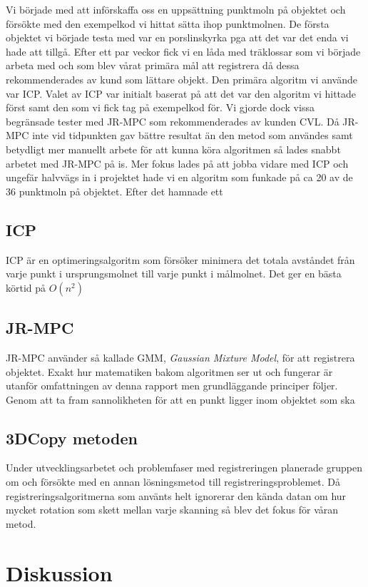 Vi började med att införskaffa oss en uppsättning punktmoln på objektet och försökte med den exempelkod vi hittat sätta ihop punktmolnen. De första objektet vi började testa med var en porslinskyrka pga att det var det enda vi hade att tillgå. Efter ett par veckor fick vi en låda med träklossar som vi började arbeta med och som blev vårat primära mål att registrera då dessa rekommenderades av kund som lättare objekt.
 Den primära algoritm vi använde var ICP. Valet av ICP var initialt baserat på att det var den algoritm vi hittade först samt den som vi fick tag på exempelkod för. Vi gjorde dock vissa begränsade tester med JR-MPC som rekommenderades av kunden CVL. Då JR-MPC inte vid tidpunkten gav bättre resultat än den metod som användes samt betydligt mer manuellt arbete för att kunna köra algoritmen så lades snabbt arbetet med JR-MPC på is. Mer fokus lades på att jobba vidare med ICP och ungefär halvvägs in i projektet hade vi en algoritm som funkade på ca 20 av de 36 punktmoln på objektet. Efter det hamnade ett 

\subsection{ICP}
ICP är en optimeringsalgoritm som försöker minimera det totala avståndet från varje punkt i ursprungsmolnet till varje punkt i målmolnet. Det ger en bästa körtid på $ \mathit{O(n^2)} $
\subsection{JR-MPC}
JR-MPC använder så kallade GMM, \textit{Gaussian Mixture Model}, för att registrera objektet. Exakt hur matematiken bakom algoritmen ser ut och fungerar är utanför omfattningen av denna rapport men grundläggande principer följer. Genom att ta fram sannolikheten för att en punkt ligger inom objektet som ska 

\subsection{3DCopy metoden}
Under utvecklingsarbetet och problemfaser med registreringen planerade gruppen om och försökte med en annan lösningsmetod till registreringsproblemet. Då registreringsalgoritmerna som använts helt ignorerar den kända datan om hur mycket rotation som skett mellan varje skanning så blev det fokus för våran metod. 

\section{Diskussion}
\label{sec:discussion-karlsson}

